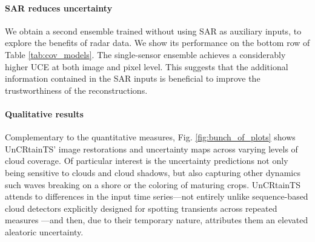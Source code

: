 \documentclass[10pt,twocolumn,letterpaper]{article}
\newcommand{\figref}[1]{ Fig. \ref{#1}}
\newcommand{\tabref}[1]{ Table \ref{#1}}
\begin{document}
\paragraph{\bf SAR reduces uncertainty} We obtain a second ensemble trained without using SAR as auxiliary inputs, to explore the benefits of radar data. We show its performance on the bottom row of \tabref{tab:cov_models}. The single-sensor ensemble achieves a considerably higher UCE at both image and pixel level. This suggests that the additional information contained in the SAR inputs is beneficial to improve the trustworthiness of the reconstructions. 




\paragraph{\bf Qualitative results} Complementary to the quantitative measures, \figref{fig:bunch_of_plots} shows UnCRtainTS' image restorations and uncertainty maps across varying levels of cloud coverage. Of particular interest is the uncertainty predictions not only being sensitive to clouds and cloud shadows, but also capturing other dynamics such waves breaking on a shore or the coloring of maturing crops. UnCRtainTS attends to differences in the input time series---not entirely unlike sequence-based cloud detectors explicitly designed for spotting transients across repeated measures \cite{MAJA}---and then, due to their temporary nature, attributes them an elevated aleatoric uncertainty.
\end{document}
